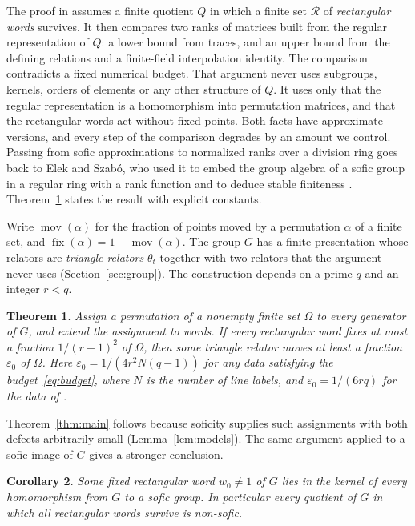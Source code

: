 \documentclass[11pt]{article}
\newtheorem{theorem}{Theorem}[section]
\newtheorem{corollary}[theorem]{Corollary}
\theoremstyle{definition}
\theoremstyle{remark}
\numberwithin{equation}{section}
\DeclareMathOperator{\fix}{fix}
\DeclareMathOperator{\mov}{mov}
\newcommand{\eps}{\varepsilon}
\newcommand{\cR}{\mathcal R}
\begin{document}
The proof in \cite{OAI252} assumes a finite quotient $Q$ in which a finite set $\cR$ of \emph{rectangular words} survives. It then compares two ranks of matrices built from the regular representation of $Q$: a lower bound from traces, and an upper bound from the defining relations and a finite-field interpolation identity. The comparison contradicts a fixed numerical budget. That argument never uses subgroups, kernels, orders of elements or any other structure of $Q$. It uses only that the regular representation is a homomorphism into permutation matrices, and that the rectangular words act without fixed points. Both facts have approximate versions, and every step of the comparison degrades by an amount we control. Passing from sofic approximations to normalized ranks over a division ring goes back to Elek and Szab\'o, who used it to embed the group algebra of a sofic group in a regular ring with a rank function and to deduce stable finiteness \cite[Theorem~1 and Corollary~4.7]{ElekSzabo2004}. Theorem~\ref{thm:quant} states the result with explicit constants.

Write $\mov(\alpha)$ for the fraction of points moved by a permutation $\alpha$ of a finite set, and $\fix(\alpha)=1-\mov(\alpha)$. The group $G$ has a finite presentation whose relators are \emph{triangle relators} $\theta_t$ together with two relators that the argument never uses (Section~\ref{sec:group}). The construction depends on a prime $q$ and an integer $r<q$.

\begin{theorem}\label{thm:quant}
Assign a permutation of a nonempty finite set $\Omega$ to every generator of $G$, and extend the assignment to words. If every rectangular word fixes at most a fraction $1/(r-1)^2$ of $\Omega$, then some triangle relator moves at least a fraction $\eps_0$ of $\Omega$. Here $\eps_0=1/(4r^2N(q-1))$ for any data satisfying the budget~\eqref{eq:budget}, where $N$ is the number of line labels, and $\eps_0=1/(6rq)$ for the data of \cite[Lemma~2.2]{OAI252}.
\end{theorem}

Theorem~\ref{thm:main} follows because soficity supplies such assignments with both defects arbitrarily small (Lemma~\ref{lem:models}). The same argument applied to a sofic image of $G$ gives a stronger conclusion.

\begin{corollary}\label{cor:residual}
Some fixed rectangular word $w_0\ne1$ of $G$ lies in the kernel of every homomorphism from $G$ to a sofic group. In particular every quotient of $G$ in which all rectangular words survive is non-sofic.
\end{corollary}
\end{document}
